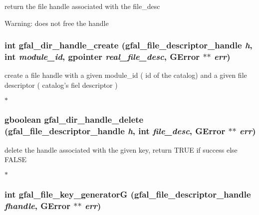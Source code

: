 return the file handle associated with the file\_\-desc \begin{Desc}
\item[Warning:]does not free the handle \end{Desc}
\subsubsection{\setlength{\rightskip}{0pt plus 5cm}int gfal\_\-dir\_\-handle\_\-create (gfal\_\-file\_\-descriptor\_\-handle {\em h}, int {\em module\_\-id}, gpointer {\em real\_\-file\_\-desc}, GError $\ast$$\ast$ {\em err})}\label{gfal__common__filedescriptor_8c_bdd3af3590b09b87b43ad27aa9ed3eb0}


create a file handle with a given module\_\-id ( id of the catalog) and a given file descriptor ( catalog's fiel descriptor )

$\ast$ 
\subsubsection{\setlength{\rightskip}{0pt plus 5cm}gboolean gfal\_\-dir\_\-handle\_\-delete (gfal\_\-file\_\-descriptor\_\-handle {\em h}, int {\em file\_\-desc}, GError $\ast$$\ast$ {\em err})}\label{gfal__common__filedescriptor_8c_6e01efded781bee066c8939310b6a366}


delete the handle associated with the given key, return TRUE if success else FALSE

$\ast$ 
\subsubsection{\setlength{\rightskip}{0pt plus 5cm}int gfal\_\-file\_\-key\_\-generator\-G (gfal\_\-file\_\-descriptor\_\-handle {\em fhandle}, GError $\ast$$\ast$ {\em err})}\label{gfal__common__filedescriptor_8c_15fd77eba0faf86bb3c0ff3939ee2b80}


